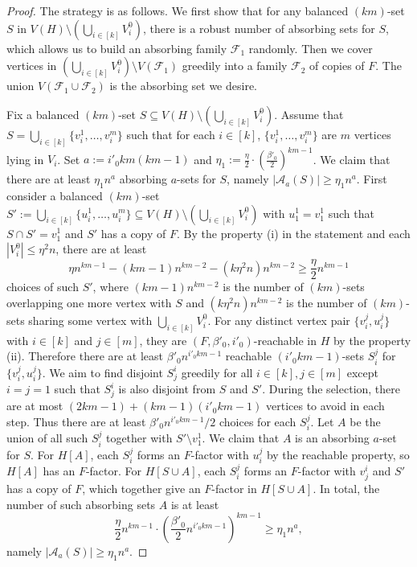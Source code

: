\documentclass[11pt,a4paper]{article}
\theoremstyle{definition}
\begin{document}
\begin{proof}
    The strategy is as follows. We first show that for any balanced $(km)$-set $S$ in $V(H)\setminus (\bigcup_{i\in [k]}V_i^0)$, there is a robust number of absorbing sets for $S$, which allows us to build an absorbing family $\mathcal{F}_1$ randomly. Then we cover vertices in $(\bigcup_{i\in [k]}V_i^0)\setminus V(\mathcal{F}_1)$ greedily into a family $\mathcal{F}_2$ of copies of $F$. The union $V(\mathcal{F}_1\cup \mathcal{F}_2)$ is the absorbing set we desire.

    Fix a balanced $(km)$-set $S\subseteq V(H)\setminus (\bigcup_{i\in [k]}V_i^0)$. Assume that $S=\bigcup_{i\in [k]}\{v_i^1,\dots ,v_i^m\}$ such that for each $i\in [k]$, $\{v_i^1,\dots ,v_i^m\}$ are $m$ vertices lying in $V_i$. Set $a:=i'_0km(km-1)$ and $\eta_1:=\frac{\eta}{2}\cdot (\frac{\beta'_0}{2})^{km-1}$. We claim that there are at least $\eta_1n^{a}$ absorbing $a$-sets for $S$, namely $|\mathcal{A}_a(S)|\geq \eta_1n^{a}$. First consider a  balanced $(km)$-set $S':=\bigcup_{i\in [k]}\{u_i^1,\dots ,u_i^m\}\subseteq V(H)\setminus (\bigcup_{i\in [k]}V_i^0)$ with $u_1^1=v_1^1$ such that $S\cap S'=v^1_1$ and $S'$ has a copy of $F$. By the property (i) in the statement and each $|V^0_i|\leq \eta^2n$, there are at least 
    $$\eta n^{km-1}-(km-1)n^{km-2}-(k\eta^2n)n^{km-2}\geq \frac{\eta}{2}n^{km-1}$$
    choices of such $S'$, where $(km-1)n^{km-2}$ is the number of $(km)$-sets overlapping one more vertex with $S$ and $(k\eta^2n)n^{km-2}$ is the number of $(km)$-sets sharing some vertex with $\bigcup_{i\in [k]}V_i^0$. For any distinct vertex pair $\{v_i^j, u_i^j\}$ with $i\in [k]$ and $j\in [m]$, they are $(F, \beta'_0, i'_0)$-reachable in $H$ by the property (ii). Therefore there are at least $\beta'_0n^{i'_0km-1}$ reachable $(i'_0km-1)$-sets $S_i^j$ for $\{v_i^j, u_i^j\}$. We aim to find disjoint $S_j^i$ greedily for all  $i\in [k], j\in [m]$ except $i=j=1$ such that $S_j^i$ is also disjoint from $S$ and $S'$. During the selection, there are at most $(2km-1)+(km-1)(i'_0km-1)$ vertices to avoid in each step. Thus there are at least $\beta'_0n^{i'_0km-1}/2$ choices for each $S_i^j$. Let $A$ be the union of all such $S_i^j$ together with $S'\setminus v_1^1$. We claim that $A$ is an absorbing $a$-set for $S$. For $H[A]$, each $S_i^j$ forms an $F$-factor with $u_i^j$ by the reachable property, so $H[A]$ has an $F$-factor. For $H[S\cup A]$, each $S_i^j$ forms an $F$-factor with $v_j^i$ and $S'$ has a copy of $F$, which together give an $F$-factor in $H[S\cup A]$. In total, the number of such absorbing sets $A$ is at least
    $$\frac{\eta}{2}n^{km-1}\cdot (\frac{\beta'_0}{2}n^{i'_0km-1})^{km-1}\geq \eta_1n^a,$$
    namely $|\mathcal{A}_a(S)|\geq \eta_1n^{a}$.


\end{proof}
\end{document}
